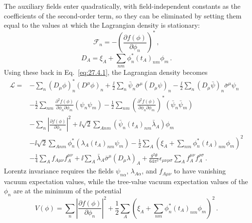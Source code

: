 The auxiliary fields enter quadratically, with field-independent constants as
the coefficients of the second-order term, so they can be eliminated by
setting them equal to the values at which the Lagrangian density is
stationary:
\begin{equation}
  \mathcal{F}_n
  =-\left(\frac{\partial f(\phi)}{\partial\phi_n}\right)^*\,,
  \tag{27.4.6}\label{eq:27.4.6}
\end{equation}
\begin{equation}
  D_A=\xi_A+\sum_{nm}\phi_n^*(t_A)_{nm}\phi_m\,.
  \tag{27.4.7}\label{eq:27.4.7}
\end{equation}
Using these back in Eq.~\eqref{eq:27.4.1}, the Lagrangian density becomes
\begin{equation}
  \begin{aligned}
  \mathcal{L}={}&
  -\sum_n(D_\mu\phi)_n^*(D^\mu\phi)_n
  +\frac{\ii}{2}\sum_n
    \bar\psi_n\bar\sigma^\mu(D_\mu\psi)_n
  -\frac{\ii}{2}\sum_n
    (D_\mu\bar\psi)_n\bar\sigma^\mu\psi_n
  \\
  &-\frac12\sum_{nm}
    \frac{\partial^2f(\phi)}{\partial\phi_n\partial\phi_m}
    \left(\psi_n\psi_m\right)
  -\frac12\sum_{nm}
    \left(
      \frac{\partial^2f(\phi)}{\partial\phi_n\partial\phi_m}
    \right)^*
    \left(\bar\psi_n\bar\psi_m\right)
  \\
  &-\sum_n\left|
    \frac{\partial f(\phi)}{\partial\phi_n}
  \right|^2
  +\ii\sqrt{2}\sum_{Anm}
    \left(\bar\psi_n(t_A)_{nm}\bar\lambda_A\right)\phi_m
  \\
  &-\ii\sqrt{2}\sum_{Anm}
    \phi_n^*\left(\lambda_A(t_A)_{nm}\psi_m\right)
  -\frac12\sum_A
    \left(\xi_A+\sum_{nm}\phi_n^*(t_A)_{nm}\phi_m\right)^2
  \\
  &-\frac14\sum_Af_{A\mu\nu}f_A^{\mu\nu}
  +\ii\sum_A\bar\lambda_A\bar\sigma^\mu(D_\mu\lambda)_A
  +\frac{g^2\theta}{64\pi^2}\epsilon_{\mu\nu\rho\sigma}
    \sum_Af_A^{\mu\nu}f_A^{\rho\sigma}\,.
  \end{aligned}
  \tag{27.4.8}\label{eq:27.4.8}
\end{equation}
Lorentz invariance requires the fields \(\psi_{n\alpha}\),
\(\lambda_{A\alpha}\), and
\(f_{A\mu\nu}\) to have vanishing vacuum expectation values, while the
tree-value vacuum expectation values of the \(\phi_n\) are at the minimum of
the potential
\begin{equation}
  V(\phi)
  =\sum_n\left|\frac{\partial f(\phi)}{\partial\phi_n}\right|^2
  +\frac12\sum_A
    \left(\xi_A+\sum_{nm}\phi_n^*(t_A)_{nm}\phi_m\right)^2\,.
  \tag{27.4.9}\label{eq:27.4.9}
\end{equation}

